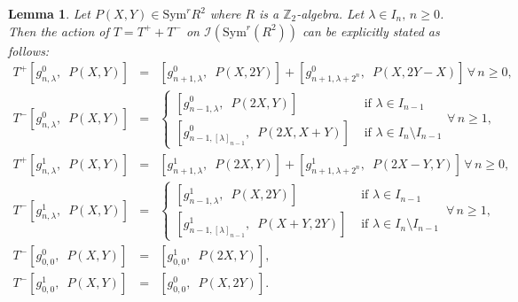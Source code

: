 \documentclass[11pt, reqno]{amsart}
\numberwithin{equation}{section}
\newcommand\Sym{{\mathrm {Sym}}}
\newtheorem{lemma}[thm]{Lemma}
\theoremstyle{definition}
\theoremstyle{remark}
\theoremstyle{definition}
\theoremstyle{remark}
\theoremstyle{remark}
\begin{document}
\begin{lemma}\label{T}
 Let $P(X,Y) \in \Sym^{r}R^{2}$ where $R$ is a $\mathbb{Z}_{2}$-algebra. Let $\lambda \in I_{n},\,n\geq 0$. 
 Then the action of $T=T^+ + T^-$ on $\mathcal{I}(\Sym^{r}(R^{2}))$ can be explicitly stated as follows:
\begin{eqnarray*}
T^+\left[g_{n,\lambda}^0,\enspace P(X,Y)\right]& = &\left[g_{n+1,\lambda}^{0},\enspace P(X,2Y)\right] +  \left[g_{n+1, \lambda+2^n}^{0},\enspace  P(X,2Y-X)\right] \,\forall \,n\geq0,\\
T^-\left[g_{n,\lambda}^0,\enspace P(X,Y)\right] &= & \begin{cases} \left[g_{n-1,\lambda}^{0}, \enspace P(2X,Y)\right]& \text{ if } \lambda \in I_{n-1}\\
\left[g_{n-1,[\lambda]_{n-1}}^{0},\enspace P(2X, X+Y)\right]& \text{ if } \lambda \in I_{n}\setminus I_{n-1}
\end{cases}\forall\, n\geq1,\\
T^+\left[g_{n,\lambda}^1,\enspace P(X,Y)\right]& = &\left[g_{n+1,\lambda}^{1},\enspace P(2X,Y)\right] +  \left[g_{n+1, \lambda+2^n}^{1},\enspace P(2X-Y,Y)\right] \,\forall\,n\geq0,\\
T^-\left[g_{n,\lambda}^1,\enspace P(X,Y)\right] &= & \begin{cases} \left[g_{n-1,\lambda}^{1},\enspace P(X,2Y)\right]& \text{ if } \lambda \in I_{n-1}\\
\left[g_{n-1,[\lambda]_{n-1}}^{1},\enspace P(X+Y, 2Y)\right]& \text{ if } \lambda \in I_{n}\setminus I_{n-1}
\end{cases}\, \forall\, n\geq1,\\
T^-\left[g_{0,0}^0,\enspace P(X,Y)\right] &= & \left[g_{0,0}^{1},\enspace P(2X,Y)\right],\\
T^-\left[g_{0,0}^1,\enspace P(X,Y)\right] &= & \left[g_{0,0}^{0},\enspace  P(X,2Y)\right].
\end{eqnarray*}
\end{lemma}
\end{document}

